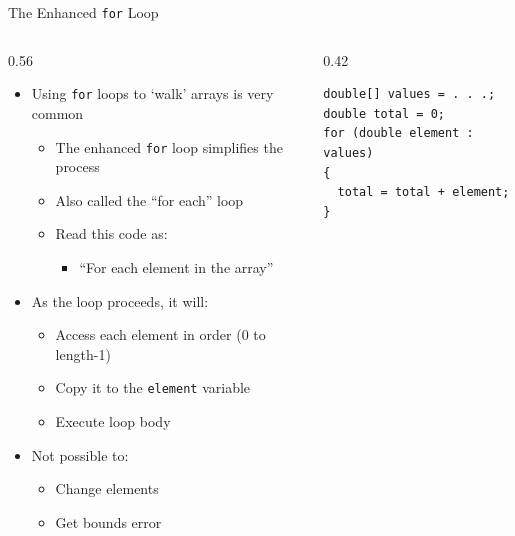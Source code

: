 \documentclass[aspectratio=43,10pt,t]{beamer}
\newcommand{\code}[1]{\texttt{#1}}
\begin{document}
\begin{frame}[fragile]{The Enhanced \texttt{for} Loop}
  \begin{columns}[T]
    \begin{column}{0.56\textwidth}
      \begin{itemize}
        \item Using \code{for} loops to `walk' arrays is very common
          \begin{itemize}
            \item The enhanced \code{for} loop simplifies the process
            \item Also called the ``for each'' loop
            \item Read this code as:
              \begin{itemize}
                \item ``For each element in the array''
              \end{itemize}
          \end{itemize}
        \item As the loop proceeds, it will:
          \begin{itemize}
            \item Access each element in order (0 to length-1)
            \item Copy it to the \code{element} variable
            \item Execute loop body
          \end{itemize}
        \item Not possible to:
          \begin{itemize}
            \item Change elements
            \item Get bounds error
          \end{itemize}
      \end{itemize}
    \end{column}
    \begin{column}{0.42\textwidth}
      \vskip32mm
\begin{lstlisting}
double[] values = . . .;
double total = 0;
for (double element : values)
{
  total = total + element;
}
\end{lstlisting}
    \end{column}
  \end{columns}
\end{frame}
\end{document}
